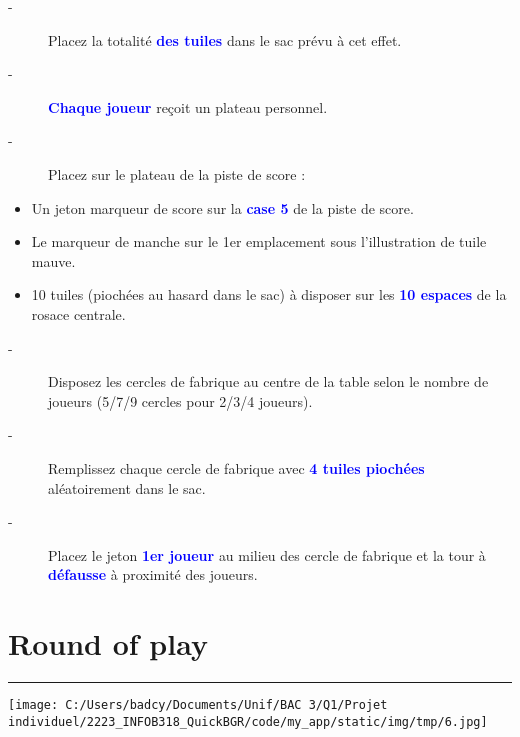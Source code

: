 \documentclass{scrartcl}%
\begin{document}
%
\begin{description}%
\item[{-} ]%
%
 Placez la totalité %
\textcolor{blue}{%
\textbf{des tuiles}%
}%
\textit{ }%
 dans le sac prévu à cet effet.
%
\item[{-} ]%
%
\textcolor{blue}{%
\textbf{Chaque joueur}%
}%
\textit{ }%
 reçoit un plateau personnel.
%
\item[{-} ]%
%
 Placez sur le plateau de la piste de score :
%
\end{description}%
\begin{itemize}%
\item%
%
 Un jeton marqueur de score sur la %
\textcolor{blue}{%
\textbf{case 5}%
}%
\textit{ }%
 de la piste de score.
%
\item%
%
 Le marqueur de manche sur le 1er emplacement sous l’illustration de tuile mauve.
%
\item%
%
 10 tuiles (piochées au hasard dans le sac) à disposer sur les %
\textcolor{blue}{%
\textbf{10 espaces}%
}%
\textit{ }%
 de la rosace centrale.
%
\end{itemize}%
\begin{description}%
\item[{-} ]%
%
 Disposez les cercles de fabrique au centre de la table selon le nombre de joueurs (5/7/9 cercles pour 2/3/4 joueurs).
%
\item[{-} ]%
%
 Remplissez chaque cercle de fabrique avec %
\textcolor{blue}{%
\textbf{4 tuiles piochées}%
}%
\textit{ }%
 aléatoirement dans le sac.
%
\item[{-} ]%
%
 Placez le jeton %
\textcolor{blue}{%
\textbf{1er joueur}%
}%
\textit{ }%
 au milieu des cercle de fabrique et la tour à %
\textcolor{blue}{%
\textbf{défausse}%
}%
\textit{ }%
 à proximité des joueurs.
%
\end{description}

%
\sectionfont{\color{mygreen}}%
\subsectionfont{\color{mygreen}}%
\subsubsectionfont{\color{mygreen}}%
\section{ Round of play
}%
\label{sec:Roundofplay}%
\textcolor{mygreen}{\rule{18cm}{0.07cm}}\break%
%
\begin{center}\texttt{[image: C:/Users/badcy/Documents/Unif/BAC 3/Q1/Projet individuel/2223\_INFOB318\_QuickBGR/code/my\_app/static/img/tmp/6.jpg]}\end{center}%
\end{document}
